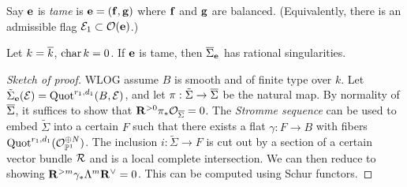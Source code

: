 \documentclass{article}
\begin{document}
\begin{dfn}
	Say $\mathbf{e}$ is \emph{tame} is $\mathbf{e} = (\mathbf{f}, \mathbf{g})$ where $\mathbf{f}$ and $\mathbf{g}$ are balanced.
	(Equivalently, there is an admissible flag $\mathcal{E}_1 \subset \mathcal{O}(\mathbf{e})$.)
\end{dfn}

\begin{thm}[Lin]
	Let $k = \overline{k}$, $\operatorname{char} k = 0$.
	If $\mathbf{e}$ is tame, then $\overline{\Sigma}_{\mathbf{e}}$ has rational singularities.
\end{thm}

\begin{proof}[Sketch of proof]
	WLOG assume $B$ is smooth and of finite type over $k$.
	Let $\tilde{\Sigma}_{\mathbf{e}}(\mathcal{E}) = \operatorname{Quot}^{r_1,d_1}(B, \mathcal{E})$, and let $\pi: \tilde{\Sigma} \to \overline{\Sigma}$ be the natural map.
	By normality of $\overline{\Sigma}$, it suffices to show that $\mathbf{R}^{> 0} \pi_* \mathcal{O}_{\overline{\Sigma}} = 0$.
	The \emph{Stromme sequence} can be used to embed $\tilde{\Sigma}$ into a certain $F$ such that there exists a flat $\gamma: F \to B$ with fibers $\operatorname{Quot}^{r_1,d_1}(\mathcal{O}_{\mathbb{P}^1}^{\oplus N})$.
	The inclusion $i: \tilde{\Sigma} \to F$ is cut out by a section of a certain vector bundle $\mathcal{R}$ and is a local complete intersection.
	We can then reduce to showing $\mathbf{R}^{> m} \gamma_*  \Lambda^m \mathbf{R}^\vee = 0$.
	This can be computed using Schur functors.
\end{proof}
\end{document}
